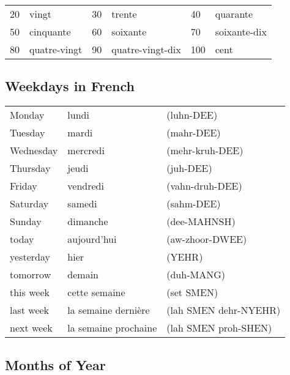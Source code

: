 \begin{tabular}{| l | l | l | l | l | l |}
\hline
20  & vingt         & 30  & trente          & 40  & quarante\\
50  & cinquante     & 60  & soixante        & 70  & soixante-dix\\
80  & quatre-vingt  & 90  & quatre-vingt-dix& 100 & cent\\
\hline
\end{tabular}

\subsection{Weekdays in French}

\begin{tabular}{| l | l | l |}
\hline
Monday    & lundi     & (luhn-DEE)      \\
Tuesday   & mardi     & (mahr-DEE)      \\
Wednesday & mercredi  & (mehr-kruh-DEE) \\
Thursday  & jeudi     & (juh-DEE)       \\
Friday    & vendredi  & (vahn-druh-DEE) \\
Saturday  & samedi    & (sahm-DEE)      \\
Sunday    & dimanche  & (dee-MAHNSH)    \\
\hline
\hline
today     & aujourd'hui & (aw-zhoor-DWEE) \\
yesterday & hier        & (YEHR)          \\
tomorrow  & demain      & (duh-MANG)    \\
this week & cette semaine & (set SMEN)  \\
last week & la semaine dernière   & (lah SMEN dehr-NYEHR)\\
next week & la semaine prochaine  & (lah SMEN proh-SHEN)  \\
\hline
\end{tabular}

\subsection{Months of Year}

